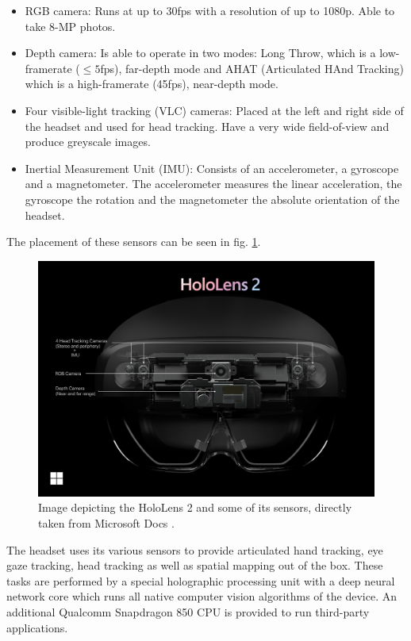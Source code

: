 \begin{itemize}
    \item RGB camera: Runs at up to 30fps with a resolution of up to 1080p. Able to take 8-MP photos.
    \item Depth camera: Is able to operate in two modes: Long Throw, which is a low-framerate ($\leq5$fps), far-depth mode and AHAT (Articulated HAnd Tracking) which is a high-framerate (45fps), near-depth mode.
    \item Four visible-light tracking (VLC) cameras: Placed at the left and right side of the headset and used for head tracking. Have a very wide field-of-view and produce greyscale images.
    \item Inertial Measurement Unit (IMU): Consists of an accelerometer, a gyroscope and a magnetometer. The accelerometer measures the linear acceleration, the gyroscope the rotation and the magnetometer the absolute orientation of the headset.
\end{itemize}

The placement of these sensors can be seen in fig. \ref{fig:holHardware}.

\begin{figure}
    \centering
    \includegraphics[width=0.9\linewidth]{figures/hololens2-front-view.png}
    \caption[Hololens 2 Hardware]{Image depicting the HoloLens 2 and some of its sensors, directly taken from Microsoft Docs \cite{HololensHardware}.}
      \label{fig:holHardware}
\end{figure}

The headset uses its various sensors to provide articulated hand tracking, eye gaze tracking, head tracking as well as spatial mapping out of the box. These tasks are performed by a special holographic processing unit with a deep neural network core which runs all native computer vision algorithms of the device. An additional Qualcomm Snapdragon 850 CPU is provided to run third-party applications. 

